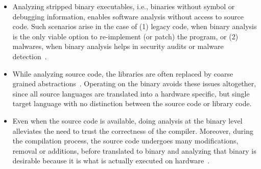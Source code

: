 \begin{itemize}
    
    \item Analyzing stripped binary executables, i.e., binaries without symbol
    or debugging information, enables software analysis without access to
    source code. Such scenarios arise in the case of (1) legacy code, when
    binary analysis is the only viable option to re-implement (or patch) the
    program, or (2) malwares, when binary analysis helps in security audits or
    malware
    detection~\cite{Christodorescu:2005,Andreas2007,Kinder:2005,Kinder:2010,Kolbitsch:2009}.
    
    \item 
    While analyzing source code, the libraries are often replaced by coarse
    grained abstractions~\cite{libabs}. Operating on the binary avoids these
    issues altogether, since all source languages are translated into a
    hardware specific, but single target language with no distinction between
    the source code or library code. 
    
    \item Even when the source code is available, doing analysis at the binary
    level alleviates the need to trust the correctness of the compiler.
    Moreover, during the compilation process, the source code undergoes many
    modifications, removal or additions, before translated to binary and
    analyzing that binary is desirable because it is what is actually executed
    on hardware~\cite{WYSINWYE}. 
    
\end{itemize}

